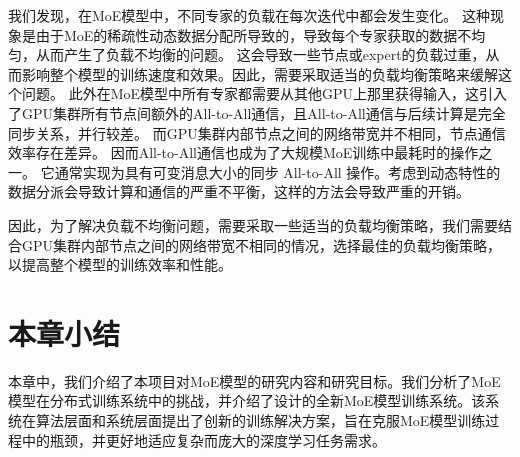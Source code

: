 我们发现，在MoE模型中，不同专家的负载在每次迭代中都会发生变化。
% 
这种现象是由于MoE的稀疏性动态数据分配所导致的，导致每个专家获取的数据不均匀，从而产生了负载不均衡的问题。
% 
这会导致一些节点或expert的负载过重，从而影响整个模型的训练速度和效果。因此，需要采取适当的负载均衡策略来缓解这个问题。
% 
此外在MoE模型中所有专家都需要从其他GPU上那里获得输入，这引入了GPU集群所有节点间额外的All-to-All通信，且All-to-All通信与后续计算是完全同步关系，并行较差。
% 
而GPU集群内部节点之间的网络带宽并不相同，节点通信效率存在差异。
% 
因而All-to-All通信也成为了大规模MoE训练中最耗时的操作之一。
% 
它通常实现为具有可变消息大小的同步 All-to-All 操作。考虑到动态特性的数据分派会导致计算和通信的严重不平衡，这样的方法会导致严重的开销。

因此，为了解决负载不均衡问题，需要采取一些适当的负载均衡策略，我们需要结合GPU集群内部节点之间的网络带宽不相同的情况，选择最佳的负载均衡策略，以提高整个模型的训练效率和性能。

\section{本章小结}

本章中，我们介绍了本项目对MoE模型的研究内容和研究目标。我们分析了MoE模型在分布式训练系统中的挑战，并介绍了设计的全新MoE模型训练系统。该系统在算法层面和系统层面提出了创新的训练解决方案，旨在克服MoE模型训练过程中的瓶颈，并更好地适应复杂而庞大的深度学习任务需求。

\endinput